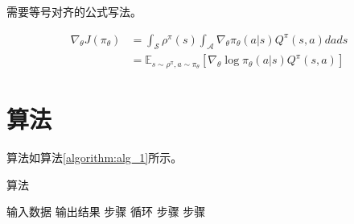 需要等号对齐的公式写法。

\begin{equation}
\begin{split}
\nabla_{\theta}J(\pi_{\theta})
& = \int_{\mathcal{S}}\rho^{\pi}(s)\int_{\mathcal{A}} \nabla_{\theta}\pi_{\theta}(a|s)Q^{\pi}(s,a)dads \\
& = \mathbb{E}_{s\sim\rho^{\pi},a\sim\pi_{\theta}}[\nabla
_{\theta}\log\pi_{\theta}(a|s)Q^{\pi}(s,a)]
\end{split}
\end{equation}

\section{算法}

算法如算法\ref{algorithm:alg_1}所示。

\begin{algorithm}[htbp]
	\caption{算法}
	\label{algorithm:alg_1}
	\begin{algorithmic}[1]
		\Require 输入数据
		\Ensure 输出结果
		\State 步骤
		\State 循环
		\State 步骤
		\EndIf
		\State 步骤
		\EndFor
	\end{algorithmic}
\end{algorithm}